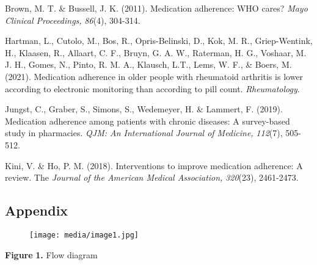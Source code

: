\documentclass{article}
\begin{document}
Brown, M. T. \& Bussell, J. K. (2011). Medication adherence: WHO cares? \emph{Mayo Clinical Proceedings, }\emph{86}(4), 304-314.

Hartman, L., Cutolo, M., Bos, R., Opris-Belinski, D., Kok, M. R., Griep-Wentink, H., Klaasen, R., Allaart, C. F., Bruyn, G. A. W., Raterman, H. G., Voshaar, M. J. H., Gomes, N., Pinto, R. M. A., Klausch, L.T., Lems, W. F., \& Boers, M. (2021). Medication adherence in older people with rheumatoid arthritis is lower according to electronic monitoring than according to pill count. \emph{Rheumatology}.

Jungst, C., Graber, S., Simons, S., Wedemeyer, H. \& Lammert, F. (2019). Medication adherence among patients with chronic diseases: A survey-based study in pharmacies. \emph{QJM: An International Journal of Medicine, }\emph{112}(7), 505-512.

Kini, V. \& Ho, P. M. (2018). Interventions to improve medication adherence: A review. The \emph{Journal of the American Medical Association, }\emph{320}(23), 2461-2473.



\subsection{Appendix}


\begin{figure}

  \texttt{[image: media/image1.jpg]}
\caption{}
\label{}


\end{figure}


\textbf{Figure}\textbf{ 1.} Flow diagram
\end{document}

